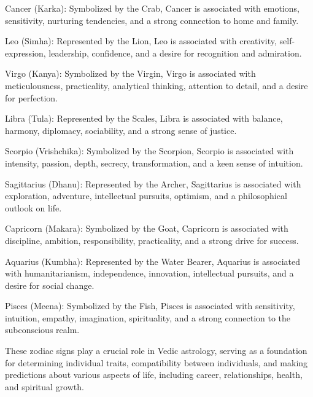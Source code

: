 Cancer (Karka): Symbolized by the Crab, Cancer is associated with emotions, sensitivity, nurturing tendencies, and a strong connection to home and family.

Leo (Simha): Represented by the Lion, Leo is associated with creativity, self-expression, leadership, confidence, and a desire for recognition and admiration.

Virgo (Kanya): Symbolized by the Virgin, Virgo is associated with meticulousness, practicality, analytical thinking, attention to detail, and a desire for perfection.

Libra (Tula): Represented by the Scales, Libra is associated with balance, harmony, diplomacy, sociability, and a strong sense of justice.

Scorpio (Vrishchika): Symbolized by the Scorpion, Scorpio is associated with intensity, passion, depth, secrecy, transformation, and a keen sense of intuition.

Sagittarius (Dhanu): Represented by the Archer, Sagittarius is associated with exploration, adventure, intellectual pursuits, optimism, and a philosophical outlook on life.

Capricorn (Makara): Symbolized by the Goat, Capricorn is associated with discipline, ambition, responsibility, practicality, and a strong drive for success.

Aquarius (Kumbha): Represented by the Water Bearer, Aquarius is associated with humanitarianism, independence, innovation, intellectual pursuits, and a desire for social change.

Pisces (Meena): Symbolized by the Fish, Pisces is associated with sensitivity, intuition, empathy, imagination, spirituality, and a strong connection to the subconscious realm.

These zodiac signs play a crucial role in Vedic astrology, serving as a foundation for determining individual traits, compatibility between individuals, and making predictions about various aspects of life, including career, relationships, health, and spiritual growth.

